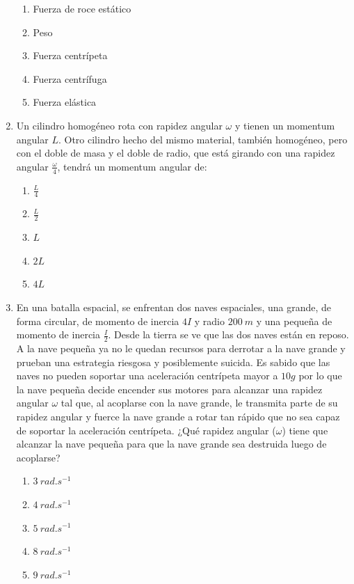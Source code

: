 \documentclass[letterpaper]{article}
\begin{document}
\begin{enumerate}
\begin{enumerate}[label=\Alph*)]
\item Fuerza de roce estático
\item Peso
\item Fuerza centrípeta
\item Fuerza centrífuga
\item Fuerza elástica
\end{enumerate}

\item Un cilindro homogéneo rota con rapidez angular $\omega$ y tienen un momentum angular $L$. Otro cilindro hecho del mismo material, también homogéneo, pero con el doble de masa y el doble de radio, que está girando con una rapidez angular $\frac\omega4$, tendrá un momentum angular de:

\begin{enumerate}[label=\Alph*)]
\item $\frac{L}{4}$
\item $\frac{L}{2}$
\item $L$
\item $2L$
\item $4L$
\end{enumerate}

\item En una batalla espacial, se enfrentan dos naves espaciales, una grande, de forma circular, de momento de inercia $4I$ y radio $200\ \si{m}$ y una pequeña de momento de inercia $\frac{I}{2}$. Desde la tierra se ve que las dos naves están en reposo. A la nave pequeña ya no le quedan recursos para derrotar a la nave grande y prueban una estrategia riesgosa y posiblemente suicida. Es sabido que las naves no pueden soportar una aceleración centrípeta mayor a $10g$ por lo que la nave pequeña decide encender sus motores para alcanzar una rapidez angular $\omega$ tal que, al acoplarse con la nave grande, le transmita parte de su rapidez angular y fuerce la nave grande a rotar tan rápido que no sea capaz de soportar la aceleración centrípeta.
¿Qué rapidez angular ($\omega$) tiene que alcanzar la nave pequeña para que la nave grande sea destruida luego de acoplarse?

\begin{enumerate}[label=\Alph*)]
\item $3\ \si{rad.s^{-1}}$
\item $4\ \si{rad.s^{-1}}$
\item $5\ \si{rad.s^{-1}}$
\item $8\ \si{rad.s^{-1}}$
\item $9\ \si{rad.s^{-1}}$
\end{enumerate}


\end{enumerate}
\end{document}
